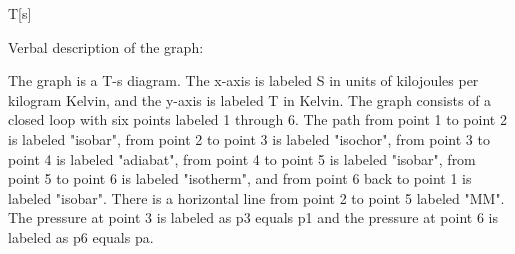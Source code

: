 T[s]

Verbal description of the graph:

The graph is a T-s diagram. The x-axis is labeled S in units of kilojoules per kilogram Kelvin, and the y-axis is labeled T in Kelvin. The graph consists of a closed loop with six points labeled 1 through 6. The path from point 1 to point 2 is labeled "isobar", from point 2 to point 3 is labeled "isochor", from point 3 to point 4 is labeled "adiabat", from point 4 to point 5 is labeled "isobar", from point 5 to point 6 is labeled "isotherm", and from point 6 back to point 1 is labeled "isobar". There is a horizontal line from point 2 to point 5 labeled "MM". The pressure at point 3 is labeled as p3 equals p1 and the pressure at point 6 is labeled as p6 equals pa.